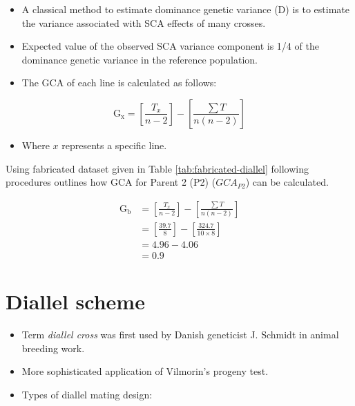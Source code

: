 \documentclass[11pt,dvipsnames,ignorenonframetext,aspectratio=169]{beamer}
\providecommand{\tightlist}{%
  \setlength{\itemsep}{0pt}\setlength{\parskip}{0pt}}
\begin{document}
\begin{frame}{}
\protect\hypertarget{section-4}{}
\begin{itemize}
\tightlist
\item
  A classical method to estimate dominance genetic variance (D) is to
  estimate the variance associated with SCA effects of many crosses.
\item
  Expected value of the observed SCA variance component is 1/4 of the
  dominance genetic variance in the reference population.
\item
  The GCA of each line is calculated as follows:
\end{itemize}

\[
\mathrm{G_x} = \left[\frac{T_x}{n-2}\right]-\left[\frac{\sum T}{n(n-2)}\right]
\]

\begin{itemize}
\tightlist
\item
  Where \(x\) represents a specific line.
\end{itemize}
\end{frame}

\begin{frame}{}
\protect\hypertarget{section-5}{}
Using fabricated dataset given in Table \ref{tab:fabricated-diallel}
following procedures outlines how GCA for Parent 2 (P2) (\(GCA_{P2}\))
can be calculated.

\begin{equation}
\begin{split}
\mathrm{G_b} & = \left[\frac{T_x}{n-2}\right]-\left[\frac{\sum T}{n(n-2)}\right] \\
 & = \left[\frac{39.7}{8}\right]-\left[\frac{324.7}{10\times 8}\right] \\
 & = 4.96-4.06 \\
 & = 0.9
\end{split}
\end{equation}
\end{frame}

\hypertarget{diallel-scheme}{%
\section{Diallel scheme}\label{diallel-scheme}}

\begin{frame}{}
\protect\hypertarget{section-6}{}
\begin{itemize}
\tightlist
\item
  Term \emph{diallel cross} was first used by Danish geneticist J.
  Schmidt in animal breeding work.
\item
  More sophisticated application of Vilmorin's progeny test.
\item
  Types of diallel mating design:
\end{itemize}
\end{frame}
\end{document}

